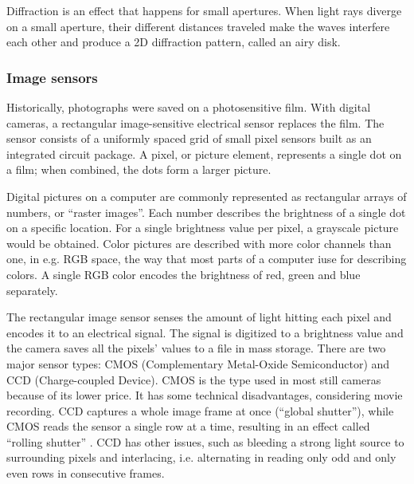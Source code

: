 Diffraction is an effect that happens for small apertures.
When light rays diverge on a small aperture, their different distances traveled make the waves interfere each other and produce a 2D diffraction pattern, called an airy disk. \cite{airydisk}



\subsubsection{Image sensors} %


Historically, photographs were saved on a photosensitive film.
With digital cameras, a rectangular image-sensitive electrical sensor replaces the film.
The sensor consists of a uniformly spaced grid of small pixel sensors built as an integrated circuit package.
A pixel, or picture element, represents a single dot on a film; when combined, the dots form a larger picture.


Digital pictures on a computer are commonly represented as rectangular arrays of numbers, or ``raster images''.
Each number describes the brightness of a single dot on a specific location.
For a single brightness value per pixel, a grayscale picture would be obtained.
Color pictures are described with more color channels than one, in e.g. RGB space, the way that most parts of a computer iuse for describing colors.
A single RGB color encodes the brightness of red, green and blue separately.


The rectangular image sensor senses the amount of light hitting each pixel and encodes it to an electrical signal.
The signal is digitized to a brightness value and the camera saves all the pixels' values to a file in mass storage.
There are two major sensor types: CMOS (Complementary Metal-Oxide Semiconductor) and CCD (Charge-coupled Device).
CMOS is the type used in most still cameras because of its lower price.
It has some technical disadvantages, considering movie recording.
CCD captures a whole image frame at once (``global shutter''), while CMOS reads the sensor a single row at a time, resulting in an effect called ``rolling shutter'' \cite{todo:cmos}.
CCD has other issues, such as bleeding a strong light source to surrounding pixels and interlacing, i.e. alternating in reading only odd and only even rows in consecutive frames.

